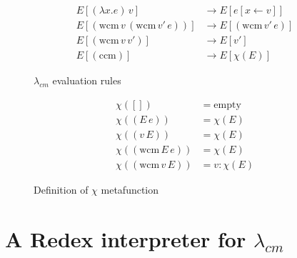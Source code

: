 \documentclass[ms,electronic,twosidetoc,letterpaper,chaptercenter,parttop]{byumsphd}
\begin{document}
\begin{figure}
\begin{align*}
E[(\lambda x.e)\,v]                         &\rightarrow E[e[x\leftarrow v]]\\
E[(\mathrm{wcm}\,v\,(\mathrm{wcm}\,v'\,e))] &\rightarrow E[(\mathrm{wcm}\,v'\,e)]\\
E[(\mathrm{wcm}\,v\,v')]                    &\rightarrow E[v']\\
E[(\mathrm{ccm})]                           &\rightarrow E[\chi(E)]
\end{align*}
\caption{$\lambda_{cm}$ evaluation rules}
\label{language-semantics}
\end{figure}

\begin{figure}
\begin{align*}
\chi([])                   &= \mathrm{empty}\\
\chi((E\,e))               &= \chi(E)\\
\chi((v\,E))               &= \chi(E)\\
\chi((\mathrm{wcm}\,E\,e)) &= \chi(E)\\
\chi((\mathrm{wcm}\,v\,E)) &= v : \chi(E)
\end{align*}
\caption{Definition of $\chi$ metafunction}
\label{chi-metafunction}
\end{figure}

\section{A Redex interpreter for $\lambda_{cm}$}
\end{document}
